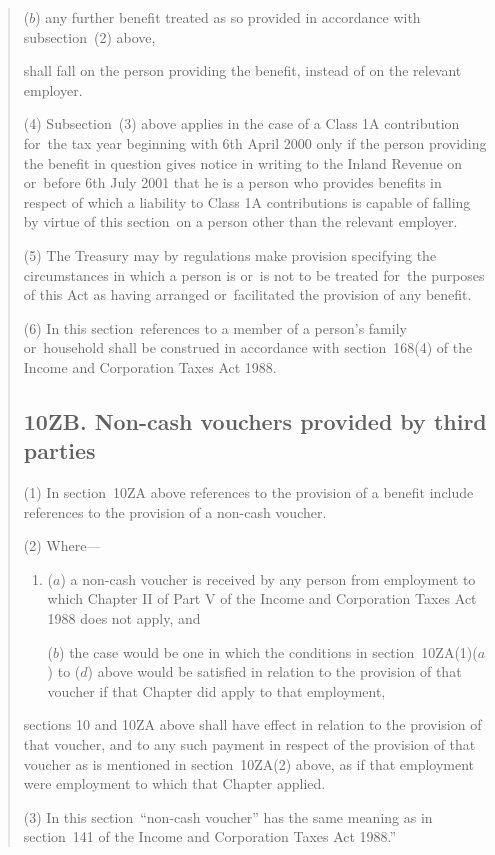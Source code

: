 \documentclass[12pt,a4paper]{article}
\begin{document}
\begin{quotation}
\begin{enumerate}
($b$) any further benefit treated as so provided in accordance with subsection~(2)  above,
\end{enumerate}
shall fall on the person providing the benefit, instead of on the relevant employer.

(4) Subsection~(3)  above applies in the case of a Class 1A contribution for~the tax year beginning with 6th April 2000 only if the person providing the benefit in question gives notice in writing to the Inland Revenue on or~before 6th July 2001 that he is a person who provides benefits in respect of which a liability to Class 1A contributions is capable of falling by virtue of this section~on a person other than the relevant employer.

(5) The Treasury may by regulations make provision specifying the circumstances in which a person is or~is not to be treated for~the purposes of this Act as having arranged or~facilitated the provision of any benefit.

(6) In this section~references to a member of a person’s family or~household shall be construed in accordance with section~168(4)  of the Income and Corporation Taxes Act 1988. 

\subsection*{10ZB. Non-cash vouchers provided by third parties}

(1) In section~10ZA above references to the provision of a benefit include references to the provision of a non-cash voucher.

(2) Where—
\begin{enumerate}\item[]
($a$) a non-cash voucher is received by any person from employment to which Chapter II of Part V of the Income and Corporation Taxes Act 1988 does not apply, and

($b$) the case would be one in which the conditions in section~10ZA(1)($a$)  to ($d$)  above would be satisfied in relation to the provision of that voucher if that Chapter did apply to that employment,
\end{enumerate}
sections 10 and 10ZA above shall have effect in relation to the provision of that voucher, and to any such payment in respect of the provision of that voucher as is mentioned in section~10ZA(2)  above, as if that employment were employment to which that Chapter applied.

(3) In this section~“non-cash voucher” has the same meaning as in section~141 of the Income and Corporation Taxes Act 1988.”
\end{quotation}
\end{document}
